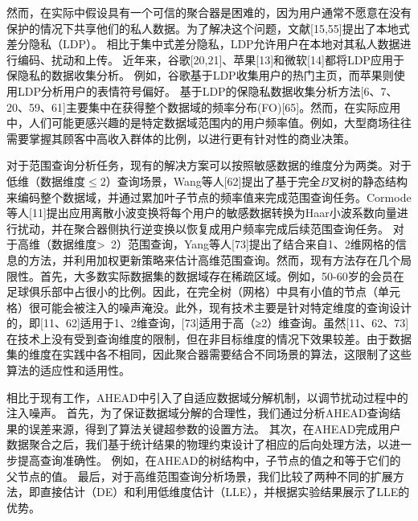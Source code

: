 然而，在实际中假设具有一个可信的聚合器是困难的，因为用户通常不愿意在没有保护的情况下共享他们的私人数据。为了解决这个问题，文献[15,55]提出了本地式差分隐私（LDP）。
相比于集中式差分隐私，LDP允许用户在本地对其私人数据进行编码、扰动和上传。
近年来，谷歌[20,21]、苹果[13]和微软[14]都将LDP应用于保隐私的数据收集分析。
例如，谷歌基于LDP收集用户的热门主页，而苹果则使用LDP分析用户的表情符号偏好。
基于LDP的保隐私数据收集分析方法[6、7、20、59、61]主要集中在获得整个数据域的频率分布(FO)[65]。然而，在实际应用中，人们可能更感兴趣的是特定数据域范围内的用户频率值。例如，大型商场往往需要掌握其顾客中高收入群体的比例，以进行更有针对性的商业决策。

对于范围查询分析任务，现有的解决方案可以按照敏感数据的维度分为两类。对于低维（数据维度$\leq 2$）查询场景，Wang等人[62]提出了基于完全$B$叉树的静态结构来编码整个数据域，并通过累加叶子节点的频率值来完成范围查询任务。Cormode等人[11]提出应用离散小波变换将每个用户的敏感数据转换为Haar小波系数向量进行扰动，并在聚合器侧执行逆变换以恢复成用户频率完成后续范围查询任务。
对于高维（数据维度\textgreater~2）范围查询，Yang等人[73]提出了结合来自1、2维网格的信息的方法，并利用加权更新策略来估计高维范围查询。然而，现有方法存在几个局限性。首先，大多数实际数据集的数据域存在稀疏区域。例如，50-60岁的会员在足球俱乐部中占很小的比例。因此，在完全树（网格）中具有小值的节点（单元格）很可能会被注入的噪声淹没。此外，现有技术主要是针对特定维度的查询设计的，即[11、62]适用于1、2维查询，[73]适用于高（≥2）维查询。虽然[11、62、73]在技术上没有受到查询维度的限制，但在非目标维度的情况下效果较差。由于数据集的维度在实践中各不相同，因此聚合器需要结合不同场景的算法，这限制了这些算法的适应性和适用性。


相比于现有工作，AHEAD中引入了自适应数据域分解机制，以调节扰动过程中的注入噪声。
首先，为了保证数据域分解的合理性，我们通过分析AHEAD查询结果的误差来源，得到了算法关键超参数的设置方法。
其次，在AHEAD完成用户数据聚合之后，我们基于统计结果的物理约束设计了相应的后向处理方法，以进一步提高查询准确性。
例如，在AHEAD的树结构中，子节点的值之和等于它们的父节点的值。
最后，对于高维范围查询分析场景，我们比较了两种不同的扩展方法，即直接估计（DE）和利用低维度估计（LLE），并根据实验结果展示了LLE的优势。

